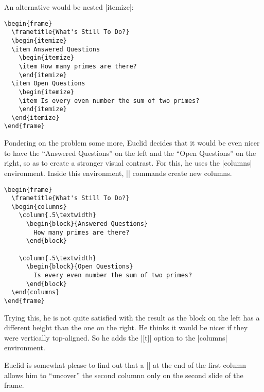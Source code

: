 An alternative would be nested |itemize|:
\begin{verbatim}
\begin{frame}
  \frametitle{What's Still To Do?}
  \begin{itemize}
  \item Answered Questions
    \begin{itemize}
    \item How many primes are there?
    \end{itemize}
  \item Open Questions
    \begin{itemize}
    \item Is every even number the sum of two primes?
    \end{itemize}
  \end{itemize}
\end{frame}
\end{verbatim}
Pondering on the problem some more, Euclid decides that it would be
even nicer to have the ``Answered Questions'' on the left and the
``Open Questions'' on the right, so as to create a stronger visual
contrast. For this, he uses the |columns| environment. Inside this
environment, |\column| commands create new columns.
\begin{verbatim}
\begin{frame}
  \frametitle{What's Still To Do?}
  \begin{columns}
    \column{.5\textwidth}
      \begin{block}{Answered Questions}
        How many primes are there?
      \end{block}

    \column{.5\textwidth}
      \begin{block}{Open Questions}
        Is every even number the sum of two primes?
      \end{block}
  \end{columns}
\end{frame}
\end{verbatim}
Trying this, he is not quite satisfied with the result as the block on
the left has a different height than the one on the right. He thinks it
would be nicer if they were vertically top-aligned. So he adds the
|[t]| option to the |columns| environment. 

Euclid is somewhat please to find out that a |\pause| at the end of
the first column allows him to ``uncover'' the second columnn only on
the second slide of the frame.



